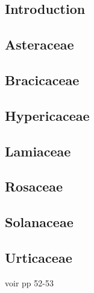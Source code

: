 \subsection{Introduction}


\subsection{Asteraceae}


\subsection{Bracicaceae}


\subsection{Hypericaceae}


\subsection{Lamiaceae}


\subsection{Rosaceae}


\subsection{Solanaceae}


\subsection{Urticaceae}


voir \cite{laporte2023} pp 52-53